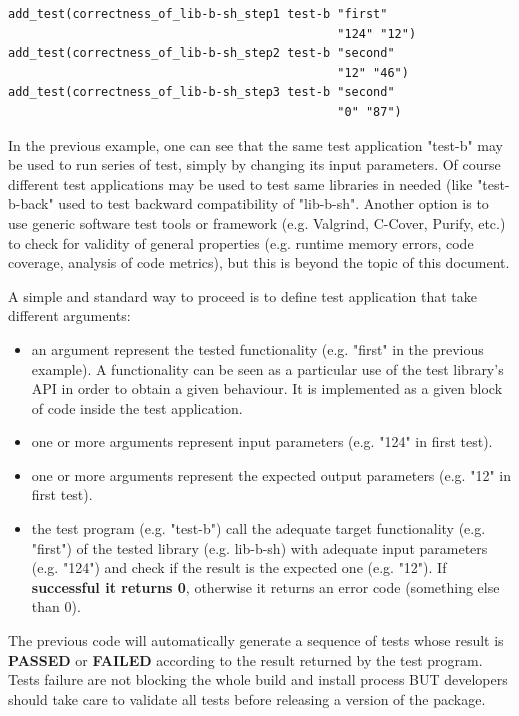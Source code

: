 \documentclass[12pt,a4paper]{article}
\begin{document}
\begin{verbatim}
add_test(correctness_of_lib-b-sh_step1 test-b "first" 
                                              "124" "12")
add_test(correctness_of_lib-b-sh_step2 test-b "second" 
                                              "12" "46")
add_test(correctness_of_lib-b-sh_step3 test-b "second" 
                                              "0" "87")

\end{verbatim}

In the previous example, one can see that the same test application "test-b" may be used to run series of test, simply by changing its input parameters. Of course different test applications may be used to test same libraries in needed (like "test-b-back" used to test backward compatibility of "lib-b-sh". Another option is to use generic software test tools or framework (e.g. Valgrind, C-Cover, Purify, etc.) to check for validity of general properties (e.g. runtime memory errors, code coverage, analysis of code metrics), but this is beyond the topic of this document.

A simple and standard way to proceed is to define test application that take different arguments: 
\begin{itemize}
\item an argument represent the tested functionality (e.g. "first" in the previous example). A functionality can be seen as a particular use of the test library's API in order to obtain a given behaviour. It is implemented as a given block of code inside the test application.
\item one or more arguments represent input parameters (e.g. "124" in first test).
\item one or more arguments represent the expected output parameters (e.g. "12" in first test).
\item the test program (e.g. "test-b") call the adequate target functionality (e.g. "first") of the tested library (e.g. lib-b-sh) with adequate input parameters (e.g. "124") and check if the result is the expected one (e.g. "12"). If \textbf{successful it returns 0}, otherwise it returns an error code (something else than 0).
\end{itemize}
The previous code will automatically generate a sequence of tests whose result is \textbf{PASSED} or \textbf{FAILED} according to the result returned by the test program. Tests failure are not blocking the whole build and install process BUT developers should take care to validate all tests before releasing a version of the package.
\end{document}
